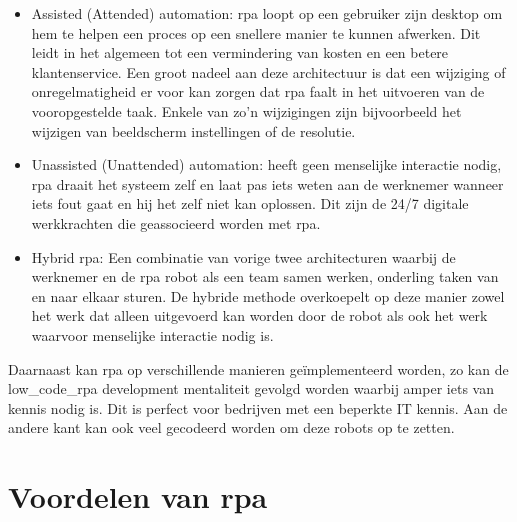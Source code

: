 \begin{itemize}
	\item Assisted (Attended) automation: \acrshort{rpa} loopt op een gebruiker zijn desktop om hem te helpen een proces op een snellere manier te kunnen afwerken. Dit leidt in het algemeen tot een vermindering van kosten en een betere klantenservice. Een groot nadeel aan deze architectuur is dat een wijziging of onregelmatigheid er voor kan zorgen dat \acrshort{rpa} faalt in het uitvoeren van de vooropgestelde taak. Enkele van zo'n wijzigingen zijn bijvoorbeeld het wijzigen van beeldscherm instellingen of de resolutie.
	\item Unassisted (Unattended) automation: heeft geen menselijke interactie nodig, \acrshort{rpa} draait het systeem zelf en laat pas iets weten aan de werknemer wanneer iets fout gaat en hij het zelf niet kan oplossen. Dit zijn de 24/7 digitale werkkrachten die geassocieerd worden met \acrshort{rpa}.
	\item Hybrid \acrshort{rpa}: Een combinatie van vorige twee architecturen waarbij de werknemer en de \acrshort{rpa} robot als een team samen werken, onderling taken van en naar elkaar sturen. De hybride methode overkoepelt op deze manier zowel het werk dat alleen uitgevoerd kan worden door de robot als ook het werk waarvoor menselijke interactie nodig is.
\end{itemize}

Daarnaast kan \acrshort{rpa} op verschillende manieren geïmplementeerd worden, zo kan de \gls{low_code_rpa} development mentaliteit gevolgd worden waarbij amper iets van kennis nodig is. Dit is perfect voor bedrijven met een beperkte IT kennis. Aan de andere kant kan ook veel gecodeerd worden om deze robots op te zetten.
\autocite{everythingRPA}

\section{Voordelen van \acrshort{rpa}}

